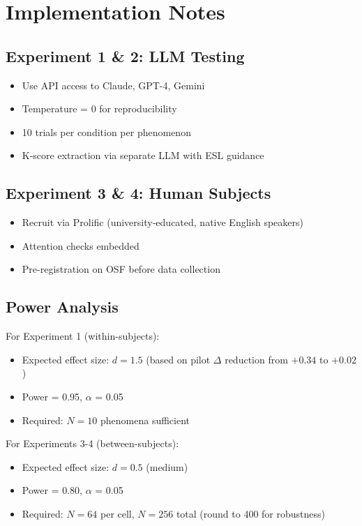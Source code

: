\documentclass[11pt,a4paper]{article}
\begin{document}
\section{Implementation Notes}

\subsection{Experiment 1 \& 2: LLM Testing}

\begin{itemize}
    \item Use API access to Claude, GPT-4, Gemini
    \item Temperature = 0 for reproducibility
    \item 10 trials per condition per phenomenon
    \item K-score extraction via separate LLM with ESL guidance
\end{itemize}

\subsection{Experiment 3 \& 4: Human Subjects}

\begin{itemize}
    \item Recruit via Prolific (university-educated, native English speakers)
    \item Attention checks embedded
    \item Pre-registration on OSF before data collection
\end{itemize}

\subsection{Power Analysis}

For Experiment 1 (within-subjects):
\begin{itemize}
    \item Expected effect size: $d = 1.5$ (based on pilot $\Delta$ reduction from $+0.34$ to $+0.02$)
    \item Power = 0.95, $\alpha$ = 0.05
    \item Required: $N = 10$ phenomena sufficient
\end{itemize}

For Experiments 3-4 (between-subjects):
\begin{itemize}
    \item Expected effect size: $d = 0.5$ (medium)
    \item Power = 0.80, $\alpha$ = 0.05
    \item Required: $N = 64$ per cell, $N = 256$ total (round to 400 for robustness)
\end{itemize}
\end{document}
